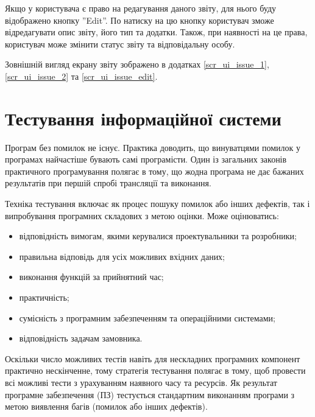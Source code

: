 \documentclass[../main.tex]{subfiles}
\begin{document}
Якщо у користувача є право на редагування даного звіту, для нього буду відображено кнопку ''Edit''. По натиску на цю кнопку користувач зможе відредагувати опис звіту, його тип та додатки. Також, при наявності на це права, користувач може змінити статус звіту та відповідальну особу.

Зовнішній вигляд екрану звіту зображено в додатках \ref{scr_ui_issue_1}, \ref{scr_ui_issue_2} та \ref{scr_ui_issue_edit}.


\section{Тестування інформаційної системи}

Програм без помилок не існує. Практика доводить, що винуватцями помилок у програмах найчастіше бувають самі програмісти. Один із загальних законів практичного програмування полягає в тому, що жодна програма не дає бажаних результатів при першій спробі трансляції та виконання.~\cite{fast_testing}

Техніка тестування включає як процес пошуку помилок або інших дефектів, так і випробування програмних складових з метою оцінки. Може оцінюватись:
\begin{itemize}
	\item відповідність вимогам, якими керувалися проектувальники та розробники;
	\item правильна відповідь для усіх можливих вхідних даних;
	\item виконання функцій за прийнятний час;
	\item практичність;
	\item сумісність з програмним забезпеченням та операційними системами;
	\item відповідність задачам замовника.
\end{itemize}

Оскільки число можливих тестів навіть для нескладних програмних компонент практично нескінченне, тому стратегія тестування полягає в тому, щоб провести всі можливі тести з урахуванням наявного часу та ресурсів. Як результат програмне забезпечення (ПЗ) тестується стандартним виконанням програми з метою виявлення багів (помилок або інших дефектів).~\cite{software_testing}
\end{document}

